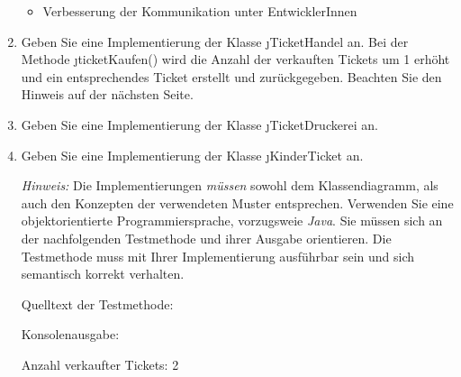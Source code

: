 \documentclass{lehramt-informatik-aufgabe}
\begin{document}
\begin{enumerate}
\begin{liAntwort}
\begin{itemize}
\item Verbesserung der Kommunikation unter EntwicklerInnen
\end{itemize}
\end{liAntwort}


\item Geben Sie eine Implementierung der Klasse \j{TicketHandel} an. Bei
der Methode \j{ticketKaufen()} wird die Anzahl der verkauften Tickets um
1 erhöht und ein entsprechendes Ticket erstellt und zurückgegeben.
Beachten Sie den Hinweis auf der nächsten Seite.

\begin{liAntwort}
\end{liAntwort}


\item Geben Sie eine Implementierung der Klasse \j{TicketDruckerei} an.

\begin{liAntwort}
\end{liAntwort}


\item Geben Sie eine Implementierung der Klasse \j{KinderTicket} an.

\begin{liAntwort}
\end{liAntwort}

\emph{Hinweis:} Die Implementierungen \emph{müssen} sowohl dem
Klassendiagramm, als auch den Konzepten der verwendeten Muster
entsprechen. Verwenden Sie eine objektorientierte Programmiersprache,
vorzugsweie \emph{Java}. Sie müssen sich an der nachfolgenden
Testmethode und ihrer Ausgabe orientieren. Die Testmethode muss mit
Ihrer Implementierung ausführbar sein und sich semantisch korrekt
verhalten.

Quelltext der Testmethode:


Konsolenausgabe:

Anzahl verkaufter Tickets: 2

\end{enumerate}
\end{document}
